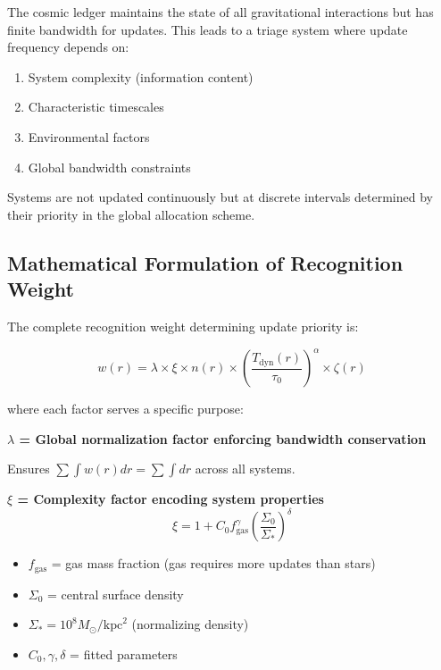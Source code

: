 \documentclass[12pt,letterpaper]{article}
\newcommand{\tdyn}{T_{\text{dyn}}}
\newcommand{\msun}{M_\odot}
\begin{document}
The cosmic ledger maintains the state of all gravitational interactions but has finite bandwidth for updates. This leads to a triage system where update frequency depends on:

\begin{enumerate}
\item System complexity (information content)
\item Characteristic timescales
\item Environmental factors
\item Global bandwidth constraints
\end{enumerate}

Systems are not updated continuously but at discrete intervals determined by their priority in the global allocation scheme.

\subsection{Mathematical Formulation of Recognition Weight}

The complete recognition weight determining update priority is:

\begin{equation}
w(r) = \lambda \times \xi \times n(r) \times \left(\frac{\tdyn(r)}{\tau_0}\right)^\alpha \times \zeta(r)
\label{eq:w_complete}
\end{equation}

where each factor serves a specific purpose:

\textbf{$\lambda$ = Global normalization factor enforcing bandwidth conservation}

Ensures $\sum\int w(r)dr = \sum\int dr$ across all systems.

\textbf{$\xi$ = Complexity factor encoding system properties}
\begin{equation}
\xi = 1 + C_0 f_{\text{gas}}^\gamma \left(\frac{\Sigma_0}{\Sigma_*}\right)^\delta
\label{eq:xi}
\end{equation}

\begin{itemize}
\item $f_{\text{gas}}$ = gas mass fraction (gas requires more updates than stars)
\item $\Sigma_0$ = central surface density
\item $\Sigma_* = 10^8 \msun/\text{kpc}^2$ (normalizing density)
\item $C_0, \gamma, \delta$ = fitted parameters
\end{itemize}
\end{document}
